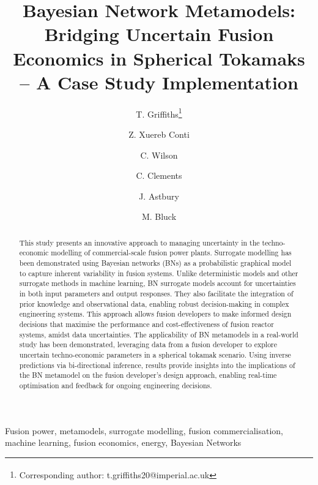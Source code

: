 \documentclass[journal]{IEEEtran}
\begin{document}
\title{Bayesian Network Metamodels: Bridging Uncertain Fusion Economics in Spherical Tokamaks -- A Case Study Implementation}

\author[1]{T. Griffiths\thanks{\textsuperscript{\Cross}Corresponding author: t.griffiths20@imperial.ac.uk}}
\author[2]{Z. Xuereb Conti}
\author[3]{C. Wilson}
\author[3]{C. Clements}
\author[3]{J. Astbury}
\author[1]{M. Bluck}

\vspace{-15pt}

\maketitle

\begin{abstract}
This study presents an innovative approach to managing uncertainty in the techno-economic modelling of commercial-scale fusion power plants. Surrogate modelling has been demonstrated using Bayesian networks (BNs) as a probabilistic graphical model to capture inherent variability in fusion systems. Unlike deterministic models and other surrogate methods in machine learning, BN surrogate models account for uncertainties in both input parameters and output responses. They also facilitate the integration of prior knowledge and observational data, enabling robust decision-making in complex engineering systems. This approach allows fusion developers to make informed design decisions that maximise the performance and cost-effectiveness of fusion reactor systems, amidst data uncertainties. The applicability of BN metamodels in a real-world study has been demonstrated, leveraging data from a fusion developer to explore uncertain techno-economic parameters in a spherical tokamak scenario. Using inverse predictions via bi-directional inference, results provide insights into the implications of the BN metamodel on the fusion developer's design approach, enabling real-time optimisation and feedback for ongoing engineering decisions. 
\end{abstract}

\begin{IEEEkeywords}
Fusion power, metamodels, surrogate modelling, fusion commercialisation, machine learning, fusion economics, energy, Bayesian Networks
\end{IEEEkeywords}
\vspace{-2ex}
\end{document}
